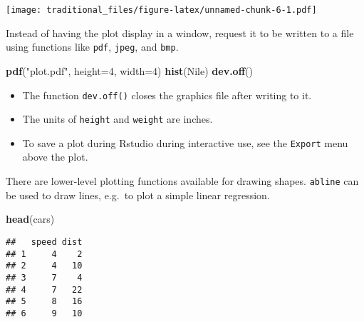\documentclass[]{article}
\newenvironment{Shaded}{\begin{snugshade}}{\end{snugshade}}
\newcommand{\KeywordTok}[1]{\textcolor[rgb]{0.13,0.29,0.53}{\textbf{#1}}}
\newcommand{\DataTypeTok}[1]{\textcolor[rgb]{0.13,0.29,0.53}{#1}}
\newcommand{\DecValTok}[1]{\textcolor[rgb]{0.00,0.00,0.81}{#1}}
\newcommand{\StringTok}[1]{\textcolor[rgb]{0.31,0.60,0.02}{#1}}
\newcommand{\OperatorTok}[1]{\textcolor[rgb]{0.81,0.36,0.00}{\textbf{#1}}}
\newcommand{\NormalTok}[1]{#1}
\providecommand{\tightlist}{%
  \setlength{\itemsep}{0pt}\setlength{\parskip}{0pt}}
\begin{document}
\texttt{[image: traditional\_files/figure-latex/unnamed-chunk-6-1.pdf]}

Instead of having the plot display in a window, request it to be written
to a file using functions like \texttt{pdf}, \texttt{jpeg}, and
\texttt{bmp}.

\begin{Shaded}
\begin{Highlighting}[]
\KeywordTok{pdf}\NormalTok{(}\StringTok{"plot.pdf"}\NormalTok{, }\DataTypeTok{height=}\DecValTok{4}\NormalTok{, }\DataTypeTok{width=}\DecValTok{4}\NormalTok{)}
\KeywordTok{hist}\NormalTok{(Nile)}
\KeywordTok{dev.off}\NormalTok{()}
\end{Highlighting}
\end{Shaded}

\begin{itemize}
\tightlist
\item
  The function \texttt{dev.off()} closes the graphics file after writing
  to it.
\item
  The units of \texttt{height} and \texttt{weight} are inches.
\item
  To save a plot during Rstudio during interactive use, see the
  \texttt{Export} menu above the plot.
\end{itemize}

There are lower-level plotting functions available for drawing shapes.
\texttt{abline} can be used to draw lines, e.g.~to plot a simple linear
regression.

\begin{Shaded}
\begin{Highlighting}[]
\KeywordTok{head}\NormalTok{(cars)}
\end{Highlighting}
\end{Shaded}

\begin{verbatim}
##   speed dist
## 1     4    2
## 2     4   10
## 3     7    4
## 4     7   22
## 5     8   16
## 6     9   10
\end{verbatim}

\begin{Shaded}
\end{Shaded}
\end{document}
